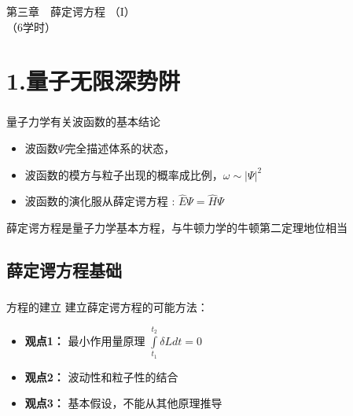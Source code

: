 \begin{frame}
		\frametitle{}
	    \begin{center}
		{ {\Huge 第三章~~薛定谔方程 （I）\\（6学时）}}
	    \end{center}    
\end{frame}

\section{1.量子无限深势阱}
\begin{frame}
	\frametitle{}  
	\begin{block}	{量子力学有关波函数的基本结论}
	\begin{itemize}
		\item 	波函数$\Psi$完全描述体系的状态，
		\item 	波函数的模方与粒子出现的概率成比例，$\omega \sim |\Psi|^2$
		\item 	波函数的演化服从薛定谔方程 : $\hat{E} \Psi = \hat{H}  \Psi $ 
	\end{itemize}
	薛定谔方程是量子力学基本方程，与牛顿力学的牛顿第二定理地位相当
	\end{block}	
\end{frame}

\subsection{薛定谔方程基础}
\begin{frame}
	\frametitle{}
	\begin{alertblock} {方程的建立}  
		建立薛定谔方程的可能方法：\\
		\begin{itemize}
			\item 	\textbf{ 观点1：}  最小作用量原理 $\int\limits_{t_1}^{t_2} \delta L d t =0 $\\ 
			\item 	\textbf{ 观点2：}  波动性和粒子性的结合\\ 
			\item 	\textbf{ 观点3：}  基本假设，不能从其他原理推导 \\
		\end{itemize}
	\end{alertblock}
\end{frame}

